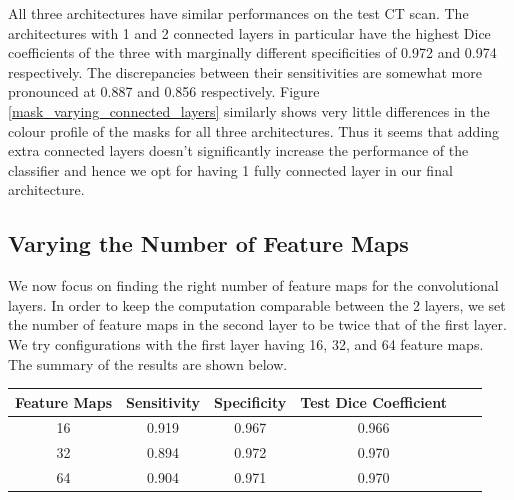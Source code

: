 \noindent All three architectures have similar performances on the test CT scan. The architectures with 1 and 2 connected layers in particular have the highest Dice coefficients of the three with marginally different specificities of 0.972 and 0.974 respectively. The discrepancies between their sensitivities are somewhat more pronounced at 0.887 and 0.856 respectively. Figure \ref{mask_varying_connected_layers} similarly shows very little differences in the colour profile of the masks for all three architectures. Thus it seems that adding extra connected layers doesn't significantly increase the performance of the classifier and hence we opt for having 1 fully connected layer in our final architecture.

\subsection{Varying the Number of Feature Maps}

\noindent We now focus on finding the right number of feature maps for the convolutional layers. In order to keep the computation comparable between the 2 layers, we set the number of feature maps in the second layer to be twice that of the first layer. We try configurations with the first layer having 16, 32, and 64 feature maps. The summary of the results are shown below.\\

{
\centering
\begin{tabular}{cccccc}
\rowcolor[HTML]{C0C0C0} 
          Feature Maps & Sensitivity & Specificity & Test Dice Coefficient \\ \hline
 16  & 0.919       & 0.967       & 0.966                                                        \\ 
 32  & 0.894       & 0.972       & 0.970                                                        \\ 
 64  & 0.904       & 0.971       & 0.970                                                        
\end{tabular}\\
\vspace{0.5cm}
}

